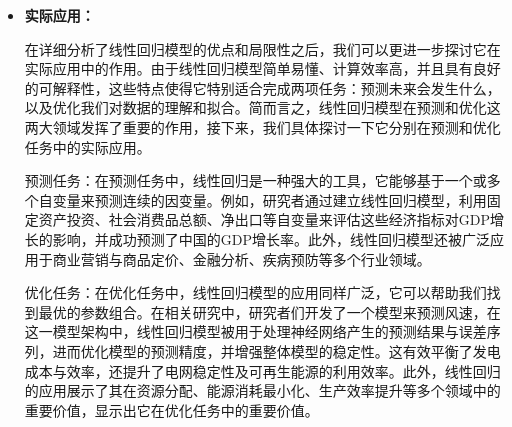 \begin{itemize}
    \item \textbf {实际应用：}
            \setlength{\parindent}{2em}
        
在详细分析了线性回归模型的优点和局限性之后，我们可以更进一步探讨它在实际应用中的作用。由于线性回归模型简单易懂、计算效率高，并且具有良好的可解释性，这些特点使得它特别适合完成两项任务：预测未来会发生什么，以及优化我们对数据的理解和拟合。简而言之，线性回归模型在预测和优化这两大领域发挥了重要的作用，接下来，我们具体探讨一下它分别在预测和优化任务中的实际应用。
        
预测任务：在预测任务中，线性回归是一种强大的工具，它能够基于一个或多个自变量来预测连续的因变量。例如，研究者通过建立线性回归模型，利用固定资产投资、社会消费品总额、净出口等自变量来评估这些经济指标对GDP增长的影响，并成功预测了中国的GDP增长率。此外，线性回归模型还被广泛应用于商业营销与商品定价、金融分析、疾病预防等多个行业领域。

优化任务：在优化任务中，线性回归模型的应用同样广泛，它可以帮助我们找到最优的参数组合。在相关研究中，研究者们开发了一个模型来预测风速，在这一模型架构中，线性回归模型被用于处理神经网络产生的预测结果与误差序列，进而优化模型的预测精度，并增强整体模型的稳定性。这有效平衡了发电成本与效率，还提升了电网稳定性及可再生能源的利用效率。此外，线性回归的应用展示了其在资源分配、能源消耗最小化、生产效率提升等多个领域中的重要价值，显示出它在优化任务中的重要价值。
\end{itemize}
